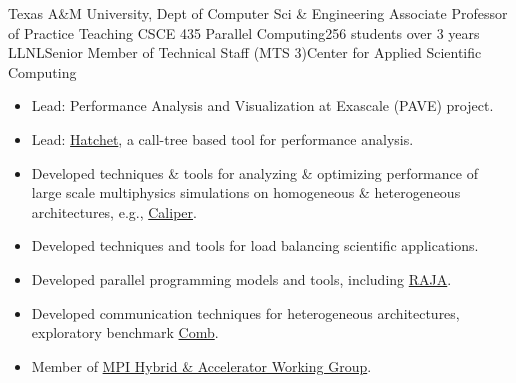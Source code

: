 		{Texas A\&M University, Dept of Computer Sci \& Engineering}
		{Associate Professor of Practice}
		{Teaching CSCE 435 Parallel Computing}{256 students over 3 years}{}
	{LLNL}{Senior Member of Technical Staff (MTS 3)}{Center for Applied Scientific Computing}{}
		{\begin{itemize}
		      \item Lead: Performance Analysis and Visualization at Exascale (PAVE) project.
		      \item Lead: \href{https://llnl-hatchet.readthedocs.io/en/latest/}{Hatchet}, a call-tree based tool for performance analysis. 
		\item Developed techniques \& tools for analyzing \& optimizing performance 
			of large scale multiphysics simulations %
			on homogeneous \& heterogeneous architectures,
	                   e.g., \href{https://software.llnl.gov/Caliper/index.html}{Caliper}.
		\item Developed techniques and tools for load balancing scientific applications.%
		\item Developed parallel programming models and tools, including \href{https://raja.readthedocs.io/en/main/}{RAJA}.
		\item Developed communication techniques for heterogeneous architectures,%
          	exploratory benchmark \href{https://github.com/LLNL/Comb}{Comb}.		
          	\item Member of \href{https://github.com/mpiwg-hybrid/hybrid-issues}{MPI Hybrid \& Accelerator Working Group}.
		\end{itemize}}